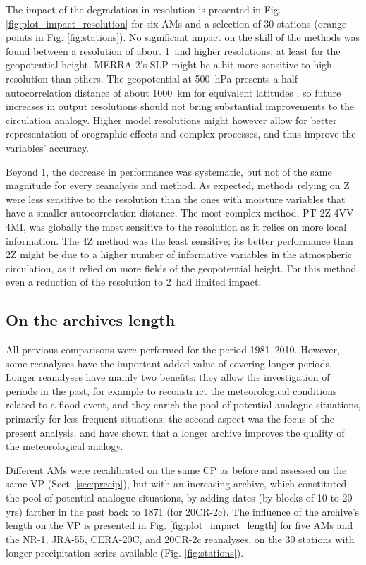 \documentclass[smallextended]{svjour3}       %
\begin{document}
	The impact of the degradation in resolution is presented in Fig. \ref{fig:plot_impact_resolution} for six AMs and a selection of 30 stations (orange points in Fig. \ref{fig:stations}). No significant impact on the skill of the methods was found between a resolution of about 1\degree\ and higher resolutions, at least for the geopotential height. MERRA-2's SLP might be a bit more sensitive to high resolution than others. The geopotential at 500~hPa presents a half-autocorrelation distance of about 1000~km for equivalent latitudes \citep{Thiebaux1985}, so future increases in output resolutions should not bring substantial improvements to the circulation analogy. Higher model resolutions might however allow for better representation of orographic effects and complex processes, and thus improve the variables' accuracy. 
	
	Beyond 1\degree, the decrease in performance was systematic, but not of the same magnitude for every reanalysis and method. As expected, methods relying on Z were less sensitive to the resolution than the ones with moisture variables that have a smaller autocorrelation distance. The most complex method, PT-2Z-4VV-4MI, was globally the most sensitive to the resolution as it relies on more local information. The 4Z method was the least sensitive; its better performance than 2Z might be due to a higher number of informative variables in the atmospheric circulation, as it relied on more fields of the geopotential height. For this method, even a reduction of the resolution to 2\degree\ had limited impact.
	
	
	\subsection{On the archives length}
	\label{sec:length}
	
	All previous comparisons were performed for the period 1981--2010. However, some reanalyses have the important added value of covering longer periods. Longer reanalyses have mainly two benefits: they allow the investigation of periods in the past, for example to reconstruct the meteorological conditions related to a flood event, and they enrich the pool of potential analogue situations, primarily for less frequent situations; the second aspect was the focus of the present analysis. \citet{Ruosteenoja1988} and \citet{Vandendool1994} have shown that a longer archive improves the quality of the meteorological analogy.
	
	Different AMs were recalibrated on the same CP as before and assessed on the same VP (Sect. \ref{sec:precip}), but with an increasing archive, which constituted the pool of potential analogue situations, by adding dates (by blocks of 10 to 20 yrs) farther in the past back to 1871 (for 20CR-2c). The influence of the archive's length on the VP is presented in Fig. \ref{fig:plot_impact_length} for five AMs and the NR-1, JRA-55, CERA-20C, and 20CR-2c reanalyses, on the 30 stations with longer precipitation series available (Fig. \ref{fig:stations}). 
	
\end{document}
